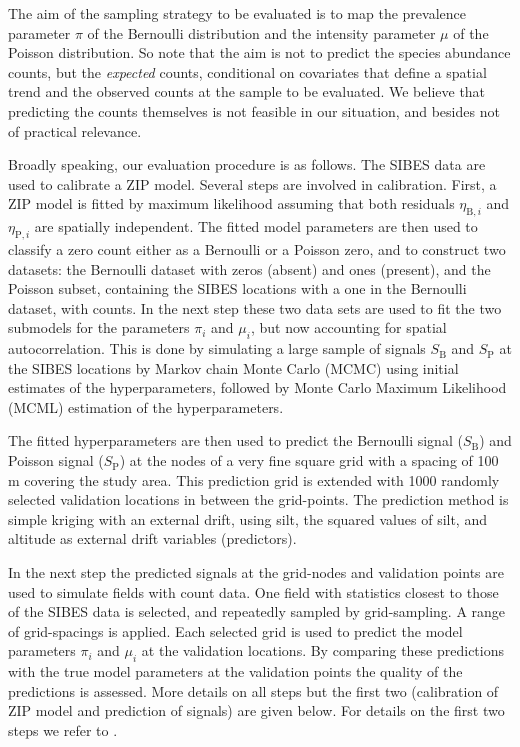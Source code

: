 \documentclass[review]{elsarticle}
\begin{document}
The aim of the sampling strategy to be evaluated is to map the prevalence parameter $\pi$ of the Bernoulli distribution and the intensity parameter $\mu$ of the Poisson distribution. So note that the aim is not to predict the species abundance counts, but the \emph{expected} counts, conditional on covariates that define a spatial trend and the observed counts at the sample to be evaluated. We believe that predicting the counts themselves is not feasible in our situation, and besides not of practical relevance.

Broadly speaking, our evaluation procedure is as follows. The SIBES data are used to calibrate a ZIP model. Several steps are involved in calibration. First, a ZIP model is fitted by maximum likelihood assuming that both residuals $\eta_{\mathrm{B},i}$ and $\eta_{\mathrm{P},i}$ are spatially independent. The fitted model parameters are then used to classify a zero count either as a Bernoulli or a Poisson zero, and to construct two datasets: the Bernoulli dataset with zeros (absent) and ones (present), and the Poisson subset, containing the SIBES locations with a one in the Bernoulli dataset, with counts. In the next step these two data sets are used to fit the two submodels for the parameters $\pi_i$ and $\mu_i$, but now accounting for spatial autocorrelation. This is done by simulating a large sample of signals $S_{\mathrm{B}}$ and $S_{\mathrm{P}}$ at the SIBES locations by Markov chain Monte Carlo (MCMC) using initial estimates of the hyperparameters, followed by Monte Carlo Maximum Likelihood (MCML) estimation of the hyperparameters.

The fitted hyperparameters are then used to predict the Bernoulli signal ($S_{\mathrm{B}}$) and Poisson signal ($S_{\mathrm{P}}$) at the nodes of a very fine square grid with a spacing of 100 m covering the study area. This prediction grid is extended with 1000 randomly selected validation locations in between the grid-points. The prediction method is simple kriging with an external drift, using silt, the squared values of silt, and altitude as external drift variables (predictors).

In the next step the predicted signals at the grid-nodes and validation points are used to simulate fields with count data. One field with statistics closest to those of the SIBES data is selected, and repeatedly sampled by grid-sampling. A range of grid-spacings is applied. Each selected grid is used to predict the model parameters $\pi_i$ and $\mu_i$ at the validation locations. By comparing these predictions with the true model parameters at the validation points the quality of the predictions is assessed. More details on all steps but the first two (calibration of ZIP model and prediction of signals) are given below. For details on the first two steps we refer to \citet{lyashevska2016a}.
\end{document}

